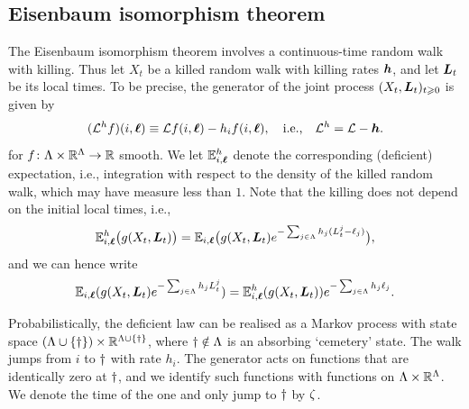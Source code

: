 \documentclass[11pt,a4paper]{article}
\begin{document}
	

\subsection{Eisenbaum isomorphism theorem}
\label{sec:eisenb-isom-theor}

The Eisenbaum isomorphism theorem involves a continuous-time random
walk with killing.  Thus let $X_{t}$ be a killed random walk with
killing rates $\boldsymbol{h}$, and let $\boldsymbol{L}_{t}$ be its local times.  To be
precise, the generator of the joint process
$(X_{t},\boldsymbol{L}_{t})_{t\geqslant 0}$ is given by
\begin{equation}
  \label{eq:SRW-gen-k}
  (\mathcal L^{h} f)(i,\boldsymbol{\ell})
  \equiv \mathcal L
  f(i,\boldsymbol{\ell}) 
  - h_{i}f(i,\boldsymbol{\ell}) 
  ,\quad \text{i.e.,}\quad
  \mathcal L^h = \mathcal L - \boldsymbol{h}.
\end{equation}
for $f\colon \Lambda\times\mathbb{R}^{\Lambda}\to \mathbb{R}$ smooth.  We let
$\mathbb{E}^{h}_{i,\boldsymbol{\ell}}$ denote the
corresponding (deficient) expectation, i.e., integration with respect to the
density of the killed random walk, which may have measure less than $1$.
Note that the killing does not depend on the initial local times, i.e.,
\begin{equation}
  \label{eq:SRW-gen-k-1}
  \mathbb{E}^{h}_{i,\boldsymbol{\ell}} \bigl({g(X_{t},\boldsymbol{L}_{t})}\bigr) 
  = 
  \mathbb{E}_{i,\boldsymbol{\ell}}\bigl({g(X_{t},\boldsymbol{L}_{t})e^{-\sum_{j\in\Lambda}h_{j}(L^{j}_{t}-\ell_j)}}\bigr),
\end{equation}
and we can hence write
\begin{equation}
  \label{eq:SRW-nokill}
  \mathbb{E}_{i,\boldsymbol{\ell}}(g(X_t,\boldsymbol{L}_t)e^{-\sum_{j\in\Lambda} h_jL_t^j}) =
  \mathbb{E}_{i,\boldsymbol{\ell}}^h(g(X_t,\boldsymbol{L}_t))e^{-\sum_{j\in\Lambda} h_j
    \ell_j}.
\end{equation}

Probabilistically, the deficient law can be realised as a Markov
process with state space
$(\Lambda\cup \{\dagger\})\times \mathbb{R}^{\Lambda\cup\{\dagger\}}$,
where $\dagger \notin\Lambda$ is an absorbing `cemetery' state.  The
walk jumps from $i$ to $\dagger$ with rate $h_{i}$. The generator
acts on functions that are identically zero at $\dagger$, and we
identify such functions with functions on
$\Lambda\times \mathbb{R}^{\Lambda}$.  We denote the time of the one and only
jump to $\dagger$ by $\zeta$.
\end{document}
